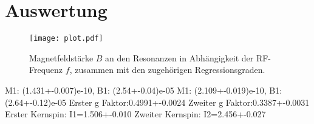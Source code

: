 \section{Auswertung}
\label{sec:Auswertung}

\begin{figure}
  \centering
  \texttt{[image: plot.pdf]}
  \caption{Magnetfeldstärke $B$ an den Resonanzen in Abhängigkeit der RF-Frequenz $f$, zusammen mit den zugehörigen Regressionsgraden.}
  \label{fig:plot}
\end{figure}

M1: (1.431+-0.007)e-10, B1: (2.54+-0.04)e-05
M1: (2.109+-0.019)e-10, B1: (2.64+-0.12)e-05
Erster g Faktor:0.4991+-0.0024
Zweiter g Faktor:0.3387+-0.0031
Erster Kernspin: I1=1.506+-0.010
Zweiter Kernspin: I2=2.456+-0.027
